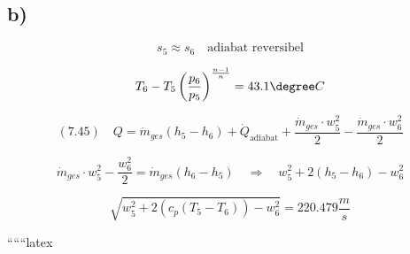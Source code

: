 

\subsection*{b)}

\[
s_5 \approx s_6 \quad \text{adiabat reversibel}
\]

\[
T_6 - T_5 \left( \frac{p_6}{p_5} \right)^{\frac{n-1}{n}} = 43.1 \degree C
\]

\[
(7.45) \quad Q = \dot{m}_{ges} (h_5 - h_6) + \dot{Q}_{\text{adiabat}} + \frac{\dot{m}_{ges} \cdot w_5^2}{2} - \frac{\dot{m}_{ges} \cdot w_6^2}{2}
\]

\[
\dot{m}_{ges} \cdot w_5^2 - \frac{w_6^2}{2} = \dot{m}_{ges} (h_6 - h_5) \quad \Rightarrow \quad w_5^2 + 2 (h_5 - h_6) - w_6^2
\]

\[
\sqrt{w_5^2 + 2 (c_p (T_5 - T_6)) - w_6^2} = 220.479 \frac{m}{s}
\]

``````latex